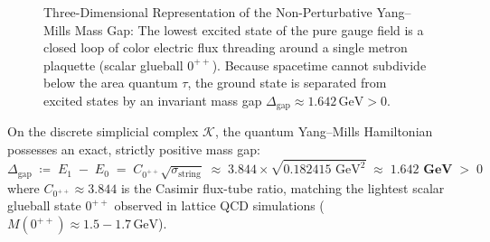 \documentclass[
    12pt,
    a4paper,
    headings=normal,
    twoside=false,
    open=any,
    parskip=half
]{scrbook}
\begin{document}
\begin{figure}[htbp]
\caption{Three-Dimensional Representation of the Non-Perturbative Yang--Mills Mass Gap: The lowest excited state of the pure gauge field is a closed loop of color electric flux threading around a single metron plaquette (scalar glueball $0^{++}$). Because spacetime cannot subdivide below the area quantum $\tau$, the ground state is separated from excited states by an invariant mass gap $\Delta_{\text{gap}} \approx 1.642\,\text{GeV} > 0$.}
\label{fig:ch8_glueball_mass_gap_3d}
\end{figure}

\begin{phystheorem}\label{thm:ch8_metronic_mass_gap_theorem}
On the discrete simplicial complex $\mathcal{K}$, the quantum Yang--Mills Hamiltonian possesses an exact, strictly positive mass gap:
\begin{equation}
\boxed{\Delta_{\text{gap}} \;\coloneqq\; E_1 \;-\; E_0 \;=\; C_{0^{++}} \sqrt{\sigma_{\text{string}}} \;\approx\; 3.844 \times \sqrt{0.182415 \text{ GeV}^2} \;\approx\; \mathbf{1.642 \text{ GeV}} \;>\; 0}
\label{eq:ch8_mass_gap_formula}
\end{equation}
where $C_{0^{++}} \approx 3.844$ is the Casimir flux-tube ratio, matching the lightest scalar glueball state $0^{++}$ observed in lattice QCD simulations ($M(0^{++}) \approx 1.5 - 1.7\,\text{GeV}$).
\end{phystheorem}
\end{document}
